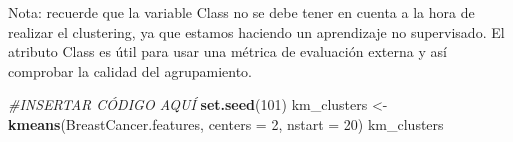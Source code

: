 \documentclass[
]{article}
\newenvironment{Shaded}{\begin{snugshade}}{\end{snugshade}}
\newcommand{\CommentTok}[1]{\textcolor[rgb]{0.56,0.35,0.01}{\textit{#1}}}
\newcommand{\DataTypeTok}[1]{\textcolor[rgb]{0.13,0.29,0.53}{#1}}
\newcommand{\DecValTok}[1]{\textcolor[rgb]{0.00,0.00,0.81}{#1}}
\newcommand{\KeywordTok}[1]{\textcolor[rgb]{0.13,0.29,0.53}{\textbf{#1}}}
\newcommand{\NormalTok}[1]{#1}
\newcommand{\StringTok}[1]{\textcolor[rgb]{0.31,0.60,0.02}{#1}}
\begin{document}
Nota: recuerde que la variable Class no se debe tener en cuenta a la
hora de realizar el clustering, ya que estamos haciendo un aprendizaje
no supervisado. El atributo Class es útil para usar una métrica de
evaluación externa y así comprobar la calidad del agrupamiento.

\begin{Shaded}
\begin{Highlighting}[]
\CommentTok{#INSERTAR CÓDIGO AQUÍ}
\KeywordTok{set.seed}\NormalTok{(}\DecValTok{101}\NormalTok{)}
\NormalTok{km_clusters <-}\StringTok{ }\KeywordTok{kmeans}\NormalTok{(BreastCancer.features, }\DataTypeTok{centers =} \DecValTok{2}\NormalTok{, }\DataTypeTok{nstart =} \DecValTok{20}\NormalTok{)}
\NormalTok{km_clusters}
\end{Highlighting}
\end{Shaded}
\end{document}
